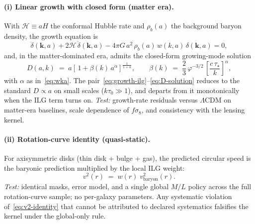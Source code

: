 \documentclass[11pt]{article}
\begin{document}
\paragraph{(i) Linear growth with closed form (matter era).}
With $\mathcal{H}\equiv aH$ the conformal Hubble rate and $\rho_b(a)$ the background baryon density, the growth equation is
\begin{equation}\label{eq:growth-ilg}
\ddot{\delta}(\mathbf{k},a)+2\mathcal{H}\,\dot{\delta}(\mathbf{k},a)-4\pi G\,a^2\,\rho_b(a)\,w(k,a)\,\delta(\mathbf{k},a)=0,
\end{equation}
and, in the matter-dominated era, admits the closed-form growing-mode solution
\begin{equation}\label{eq:D-solution}
D(a,k)\;=\;a\left[\,1+\beta(k)\,a^{\alpha}\right]^{\frac{1}{1+\alpha}},
\qquad \beta(k)\;=\;\frac{2}{3}\,\varphi^{-3/2}\,\left[\frac{c\,\tau_\star}{k}\right]^{\alpha},
\end{equation}
with $\alpha$ as in~\eqref{eq:wka}. The pair~\eqref{eq:growth-ilg}--\eqref{eq:D-solution} reduces to the standard $D\propto a$ on small scales ($k\tau_0\gg 1$), and departs from it monotonically when the ILG term turns on. \emph{Test:} growth-rate residuals versus $\Lambda$CDM on matter-era baselines, scale dependence of $f\sigma_8$, and consistency with the lensing kernel. 

\paragraph{(ii) Rotation-curve identity (quasi-static).}
For axisymmetric disks (thin disk + bulge + gas), the predicted circular speed is the baryonic prediction multiplied by the local ILG weight:
\begin{equation}\label{eq:v2-identity}
v^2(r)\;=\;w(r)\;v^2_{\mathrm{baryon}}(r).
\end{equation}
\emph{Test:} identical masks, error model, and a single global $M/L$ policy across the full rotation-curve sample; no per-galaxy parameters. Any systematic violation of~\eqref{eq:v2-identity} that cannot be attributed to declared systematics falsifies the kernel under the global-only rule. 
\end{document}
